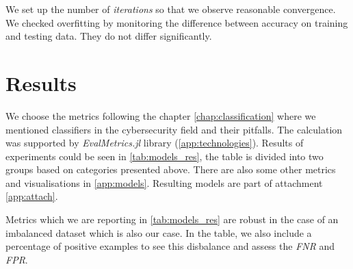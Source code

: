 We set up the number of \emph{iterations}  so that we observe reasonable convergence. We checked overfitting by monitoring the difference between accuracy on training and testing data. They do not differ significantly.

\section{Results}
We choose the metrics following the chapter \ref{chap:classification} where we mentioned classifiers in the cybersecurity field and their pitfalls. The calculation was supported by \emph{EvalMetrics.jl} library (\ref{app:technologies}). Results of experiments could be seen in \ref{tab:models_res}, the table is divided into two groups based on categories presented above. There are also some other metrics and visualisations in \ref{app:models}. Resulting models are part of attachment \ref{app:attach}.

Metrics which we are reporting in \ref{tab:models_res} are robust in the case of an imbalanced dataset which is also our case. In the table, we also include a percentage of positive examples to see this disbalance and assess the \emph{FNR} and \emph{FPR}.

